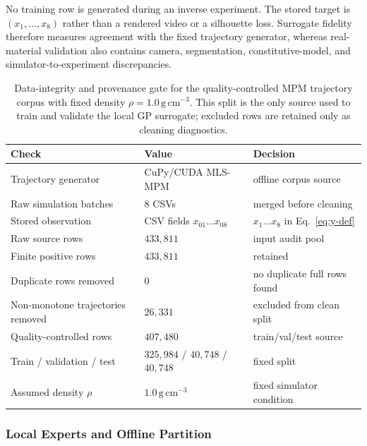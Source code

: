 No training row is generated during an inverse experiment. The stored
target is $(x_1,\ldots,x_8)$ rather than a rendered video or a silhouette
loss. Surrogate fidelity therefore measures agreement with the fixed
trajectory generator, whereas real-material validation also contains
camera, segmentation, constitutive-model, and simulator-to-experiment
discrepancies.

\begin{table}[!htbp]
\centering
\footnotesize
\setlength{\tabcolsep}{5pt}
\caption{Data-integrity and provenance gate for the quality-controlled
MPM trajectory corpus with fixed density
$\rho=1.0\,\mathrm{g\,cm}^{-3}$. This split is the
only source used to train and validate the local GP surrogate; excluded
rows are retained only as cleaning diagnostics.}
\label{tab:data-integrity}
\begin{tabular}{@{}p{}p{}p{}@{}}
\toprule
Check & Value & Decision \\
\midrule
Trajectory generator & CuPy/CUDA MLS-MPM & offline corpus source \\
Raw simulation batches & $8$ CSVs & merged before cleaning \\
Stored observation & CSV fields $x_{01}\ldots x_{08}$ &
  $x_1\ldots x_8$ in Eq.~\eqref{eq:y-def} \\
Raw source rows & $433{,}811$ & input audit pool \\
Finite positive rows & $433{,}811$ & retained \\
Duplicate rows removed & $0$ & no duplicate full rows found \\
Non-monotone trajectories removed & $26{,}331$ & excluded from clean split \\
Quality-controlled rows & $407{,}480$ & train/val/test source \\
Train / validation / test & $325{,}984$ / $40{,}748$ / $40{,}748$ & fixed split \\
Assumed density $\rho$ & $1.0\,\mathrm{g\,cm}^{-3}$ & fixed simulator condition \\
\bottomrule
\end{tabular}
\end{table}

\subsubsection{Local Experts and Offline Partition}

\label{sec:repr}


